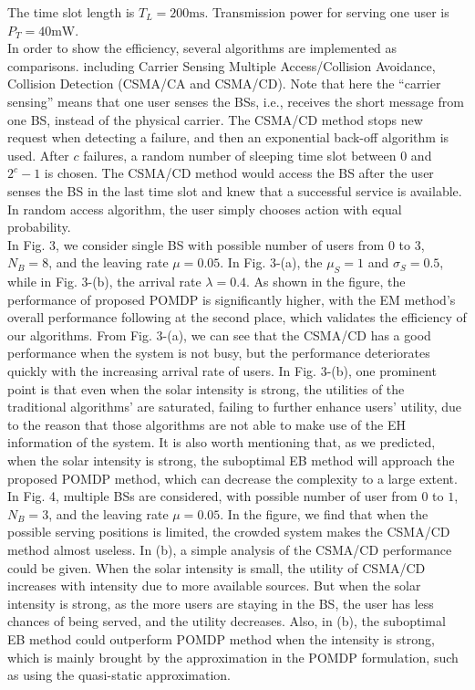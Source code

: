 \documentclass[journal,12pt,draftclsnofoot,onecolumn]{IEEEtran}
\begin{document}
The time slot length is \(T_L = 200\mbox{ms}\).
Transmission power for serving one user is \(P_T = 40\mbox{mW}\).\\
\indent In order to show the efficiency, several algorithms are implemented as comparisons.
including Carrier Sensing Multiple Access/Collision Avoidance, Collision Detection (CSMA/CA and CSMA/CD).
Note that here the ``carrier sensing'' means that one user senses the BSs, i.e., receives the short message from one BS, instead of the physical carrier.
The CSMA/CD method stops new request when detecting a failure, and then an exponential back-off algorithm is used.
After \(c\) failures, a random number of sleeping time slot between \(0\) and \(2^c - 1\) is chosen.
The CSMA/CD method would access the BS after the user senses the BS in the last time slot
and knew that a successful service is available.
In random access algorithm, the user simply chooses action with equal probability.\\
\indent In Fig. 3, we consider single BS with possible number of users from \(0\) to \(3\), \(N_B = 8\),
and the leaving rate \(\mu = 0.05\).
In Fig. 3-(a), the \(\mu_S = 1\) and \(\sigma_S = 0.5\), while in Fig. 3-(b), the arrival rate \(\lambda = 0.4\).
As shown in the figure, the performance of proposed POMDP is significantly higher,
with the EM method's overall performance following at the second place,
which validates the efficiency of our algorithms.
From Fig. 3-(a), we can see that the CSMA/CD has a good performance when the system is not busy,
but the performance deteriorates quickly with the increasing arrival rate of users.
In Fig. 3-(b), one prominent point is that even when the solar intensity is strong,
the utilities of the traditional algorithms' are saturated, failing to further enhance users' utility, due to the reason that those algorithms are not able to make use of the EH information of the system.
It is also worth mentioning that, as we predicted, when the solar intensity is strong,
the suboptimal EB method will approach the proposed POMDP method, which can decrease the complexity to a large extent.\\
\indent In Fig. 4, multiple BSs are considered, with possible number of user from \(0\) to \(1\),
\(N_B = 3\), and the leaving rate \(\mu = 0.05\).
In the figure, we find that when the possible serving positions is limited, the crowded system makes the CSMA/CD method almost useless.
In (b), a simple analysis of the CSMA/CD performance could be given.
When the solar intensity is small, the utility of CSMA/CD increases with intensity due to more available sources.
But when the solar intensity is strong, as the more users are staying in the BS,
the user has less chances of being served, and the utility decreases.
Also, in (b), the suboptimal EB method could outperform POMDP method when the intensity is strong,
which is mainly brought by the approximation in the POMDP formulation, such as using the quasi-static approximation.
\end{document}
